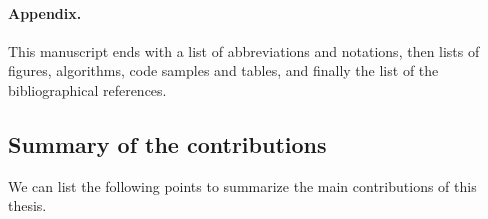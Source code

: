 \paragraph{Appendix.}
%
%
This manuscript ends with
a list of abbreviations and notations, then lists of figures, algorithms, code samples and tables,
and finally the list of the bibliographical references.





\subsection{Summary of the contributions}
\label{sec:1:summaryOfContributions}

We can list the following points to summarize the main contributions of this thesis.

